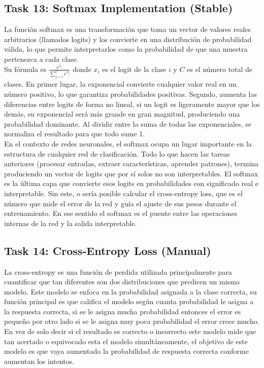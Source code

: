 ﻿\documentclass[12pt]{article}
\begin{document}
\subsection*{Task 13: Softmax Implementation (Stable)}
La función softmax es una transformación que toma un vector de valores reales
arbitrarios (llamados logits) y los convierte en una distribución de probabilidad 
válida, lo que permite interpretarlos como la probabilidad de que una muestra 
pertenezca a cada clase.\\
Su fórmula es $\displaystyle \frac{e^{x_i}}{\sum_{j=i}^{C} e^{x_j}}$ donde $x_i$ es el 
logit de la clase $i$ y $C$ es el número total de clases. En primer lugar, la exponencial convierte cualquier
valor real en un número positivo, lo que garantiza probabilidades positivas. 
Segundo, aumenta las diferencias entre logits de forma no lineal, si un logit es ligeramente mayor que los demás,
su exponencial será más grande en gran magnitud, produciendo una probabilidad dominante. Al dividir entre la suma
de todas las exponenciales, se normaliza el resultado para que todo sume 1.\\
En el contexto de redes neuronales, el softmax ocupa un lugar importante en la estructura de cualquier red de clasificación.
Todo lo que hacen las tareas anteriores (procesar entradas, extraer características, aprender patrones), termina produciendo
un vector de logits que por sí solos no son interpretables. El softmax es la última capa que convierte esos logits en probabilidades
con significado real e interpretable. Sin este, o sería posible calcular el cross-entropy loss, que es el número que mide el error de
la red y guía el ajuste de sus pesos durante el entrenamiento. En ese sentido el softmax es el puente entre las operaciones internas de 
la red y la salida interpretable.
\subsection*{Task 14: Cross-Entropy Loss (Manual)}
La cross-entropy es una función de perdida utilizada principalmente para cuantificar que tan diferentes son dos distribuciones que predicen un mismo modelo.
Este modelo se enfoca en la probabilidad asignada a la clase correcta, su función principal es que califica el modelo según cuanta probabilidad le asigna a la respuesta correcta, si se le asigna mucha probabilidad entonces el error es pequeño por otro lado si se le asigna muy poca probabilidad el error crece mucho. En vez de solo decir si el resultado es correcto o incorrecto este modelo mide que tan acertado o equivocado esta el modelo simultáneamente, el objetivo de este modelo es que vaya aumentado la probabilidad de respuesta correcta conforme aumentan los intentos.
\end{document}
